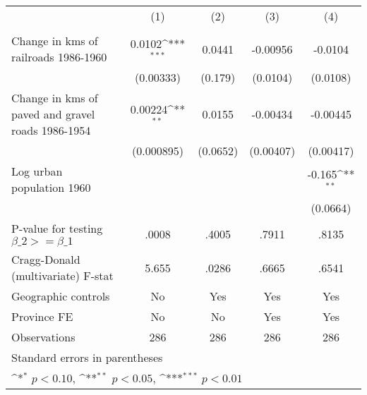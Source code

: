 {
\def\sym#1{\ifmmode^{#1}\else\(^{#1}\)\fi}
\begin{tabular}{l*{4}{c}}
\hline\hline
                &\multicolumn{1}{c}{(1)}&\multicolumn{1}{c}{(2)}&\multicolumn{1}{c}{(3)}&\multicolumn{1}{c}{(4)}\\
                &\multicolumn{1}{c}{}&\multicolumn{1}{c}{}&\multicolumn{1}{c}{}&\multicolumn{1}{c}{}\\
\hline
Change in kms of railroads 1986-1960&   0.0102\sym{***}&   0.0441         & -0.00956         &  -0.0104         \\
                &(0.00333)         &  (0.179)         & (0.0104)         & (0.0108)         \\
[1em]
Change in kms of paved and gravel roads 1986-1954&  0.00224\sym{**} &   0.0155         & -0.00434         & -0.00445         \\
                &(0.000895)         & (0.0652)         &(0.00407)         &(0.00417)         \\
[1em]
Log urban population 1960&                  &                  &                  &   -0.165\sym{**} \\
                &                  &                  &                  & (0.0664)         \\
\hline
P-value for testing $\beta\_{2} >= \beta\_{1}$&    .0008         &    .4005         &    .7911         &    .8135         \\
Cragg-Donald (multivariate) F-stat&    5.655         &    .0286         &    .6665         &    .6541         \\
Geographic controls&       No         &      Yes         &      Yes         &      Yes         \\
Province FE     &       No         &       No         &      Yes         &      Yes         \\
Observations    &      286         &      286         &      286         &      286         \\
\hline\hline
\multicolumn{5}{l}{\footnotesize Standard errors in parentheses}\\
\multicolumn{5}{l}{\footnotesize \sym{*} \(p<0.10\), \sym{**} \(p<0.05\), \sym{***} \(p<0.01\)}\\
\end{tabular}
}
